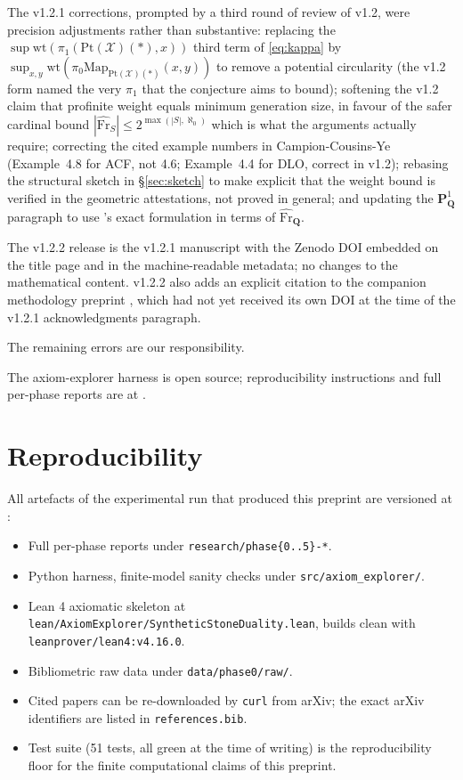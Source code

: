 \documentclass[11pt]{article}
\theoremstyle{definition}
\theoremstyle{plain}
\theoremstyle{remark}
\newcommand{\Pt}{\mathrm{Pt}}
\newcommand{\Map}{\mathrm{Map}}
\newcommand{\Frhat}{\widehat{\mathrm{Fr}}}
\newcommand{\Pone}{\mathbf{P}^{1}}
\newcommand{\Q}{\mathbf{Q}}
\begin{document}
The v1.2.1 corrections, prompted by a third round of review of v1.2,
were precision adjustments rather than substantive: replacing the
$\sup \mathrm{wt}(\pi_1(\Pt(\mathcal X)(\ast),x))$ third term of \eqref{eq:kappa}
by $\sup_{x,y} \mathrm{wt}(\pi_0\Map_{\Pt(\mathcal X)(\ast)}(x,y))$ to remove a
potential circularity (the v1.2 form named the very $\pi_1$ that the
conjecture aims to bound); softening the v1.2 claim that profinite
weight equals minimum generation size, in favour of the safer cardinal
bound $|\Frhat_S| \le 2^{\max(|S|,\aleph_0)}$ which is what the
arguments actually require; correcting the cited example numbers in
Campion-Cousins-Ye (Example~4.8 for ACF, not 4.6; Example~4.4 for DLO,
correct in v1.2); rebasing the structural sketch in
\S\ref{sec:sketch} to make explicit that the weight bound is verified
in the geometric attestations, not proved in general; and updating the
$\Pone_{\Q}$ paragraph to use \cite[Remark 7.14]{HHLMMW2025}'s exact
formulation in terms of $\Frhat_{\Q}$.

The v1.2.2 release is the v1.2.1 manuscript with the Zenodo DOI
embedded on the title page and in the machine-readable metadata; no
changes to the mathematical content. v1.2.2 also adds an explicit
citation to the companion methodology preprint
\cite{Vera2026Methodology}, which had not yet received its own DOI at
the time of the v1.2.1 acknowledgments paragraph.

The remaining errors are our responsibility.

The axiom-explorer harness is open source; reproducibility instructions and
full per-phase reports are at \cite{AxiomExplorerRepo}.

\section{Reproducibility}

All artefacts of the experimental run that produced this preprint are
versioned at \cite{AxiomExplorerRepo}:

\begin{itemize}
\item Full per-phase reports under \texttt{research/phase\{0..5\}-*}.
\item Python harness, finite-model sanity checks under
\texttt{src/axiom\_explorer/}.
\item Lean 4 axiomatic skeleton at
\texttt{lean/AxiomExplorer/SyntheticStoneDuality.lean}, builds clean with
\texttt{leanprover/lean4:v4.16.0}.
\item Bibliometric raw data under \texttt{data/phase0/raw/}.
\item Cited papers can be re-downloaded by \texttt{curl} from arXiv;
the exact arXiv identifiers are listed in \texttt{references.bib}.
\item Test suite (51 tests, all green at the time of writing) is the
reproducibility floor for the finite computational claims of this preprint.
\end{itemize}
\end{document}
